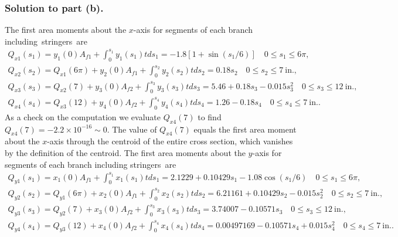 \documentclass{AeroStructure-ERJohnson}
\begin{document}
\begin{example*}
\subsubsection{Solution to part (b).} The first area moments about the $x$-axis for segments of each branch including~string\-ers~are
\begin{gather}\label{ex3.4f}
Q_{x 1}\left(s_{1}\right)=y_{1}(0) A_{f 1}+\int_{0}^{s_{1}} y_{1}\left(s_{1}\right) t d s_{1}=-1.8\left[1+\sin \left(s_{1} / 6\right)\right] \quad 0 \leq s_{1} \leq 6 \pi,\\[6pt]
Q_{x 2}\left(s_{2}\right)=Q_{x 1}(6 \pi)+y_{2}(0) A_{f 1}+\int_{0}^{s_{2}} y_{2}\left(s_{2}\right) t d s_{2}=0.18 s_{2} \quad 0 \leq s_{2} \leq 7~\textrm{in.},\label{ex3.4g}\\[6pt]
Q_{x 3}\left(s_{3}\right)=Q_{x 2}(7)+y_{3}(0) A_{f 2}+\int_{0}^{s_{3}} y_{3}\left(s_{3}\right) t d s_{3}=5.46+0.18 s_{3}-0.015 s_{3}^{2} \quad 0 \leq s_{3} \leq 12~\textrm{in.},\label{ex3.4h}\\[6pt]
Q_{x 4}\left(s_{4}\right)=Q_{x 3}(12)+y_{4}(0) A_{f 2}+\int_{0}^{s_{4}} y_{4}\left(s_{4}\right) t d s_{4}=1.26-0.18 s_{4} \quad 0 \leq s_{4} \leq 7~\text{in.}.\label{ex3.4i}
\end{gather}
As a check on the computation we evaluate $Q_{x 4}(7)$ to find $Q_{x 4}(7)=-2.2 \times 10^{-16} \sim 0$. The value of $Q_{x 4}(7)$ equals the first area moment about the $x$-axis through the centroid of the entire cross section, which vanishes by the definition of the centroid. The first area moments about the $y$-axis for segments of each branch including stringers~are\pagebreak
\begin{gather}\label{ex3.4j}
Q_{y 1}\left(s_{1}\right)=x_{1}(0) A_{f 1}+\int_{0}^{s_{1}} x_{1}\left(s_{1}\right) t d s_{1}=2.1229+0.10429 s_{1}-1.08 \cos \left(s_{1} / 6\right) \quad 0 \leq s_{1} \leq 6 \pi,\\[6pt]
Q_{y 2}\left(s_{2}\right)=Q_{y 1}(6 \pi)+x_{2}(0) A_{f 1}+\int_{0}^{s_{2}} x_{2}\left(s_{2}\right) t d s_{2}=6.21161+0.10429 s_{2}-0.015 s_{2}^{2} \quad 0 \leq s_{2} \leq 7~\text{in.},\label{ex3.4k}\\[6pt]
Q_{y 3}\left(s_{3}\right)=Q_{y 2}(7)+x_{3}(0) A_{f 2}+\int_{0}^{s_{3}} x_{3}\left(s_{3}\right) t d s_{3}=3.74007-0.10571 s_{3} \quad 0 \leq s_{3} \leq 12~\mathrm{ in.},\label{ex3.4l}\\[6pt]
Q_{y 4}\left(s_{4}\right)=Q_{y 3}(12)+x_{4}(0) A_{f 2}+\int_{0}^{s_{4}} x_{4}\left(s_{4}\right) t d s_{4}=0.00497169-0.10571 s_{4}+0.015 s_{4}^{2} \quad 0 \leq s_{4} \leq 7~\text{in.}.\tag{d}

\end{gather}
\end{example*}
\end{document}
